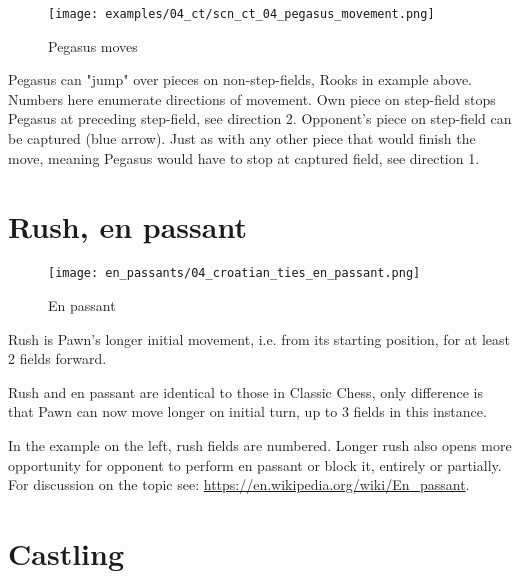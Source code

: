 \noindent
\begin{figure}[!h]
\vspace{-1.2\baselineskip}
\texttt{[image: examples/04\_ct/scn\_ct\_04\_pegasus\_movement.png]}
\caption{Pegasus moves}
\label{fig:scn_ct_04_pegasus_movement}
\end{figure}

Pegasus can "jump" over pieces on non-step-fields, Rooks in example above. Numbers
here enumerate directions of movement. Own piece on step-field stops Pegasus at
preceding step-field, see direction 2. Opponent's piece on step-field can be captured
(blue arrow). Just as with any other piece that would finish the move, meaning Pegasus
would have to stop at captured field, see direction 1.

\clearpage %

\section*{Rush, en passant}
\label{sec:Croatian Ties/Rush, en passant}

\noindent
\begin{wrapfigure}{l}{0.4\textwidth}
\centering
\texttt{[image: en\_passants/04\_croatian\_ties\_en\_passant.png]}
\caption{En passant}
\label{fig:04_croatian_ties_en_passant}
\end{wrapfigure}
Rush is Pawn's longer initial movement, i.e. from its starting position, for at least
2 fields forward.

Rush and en passant are identical to those in Classic Chess, only difference is that Pawn
can now move longer on initial turn, up to 3 fields in this instance.

In the example on the left, rush fields are numbered. Longer rush also opens more opportunity
for opponent to perform en passant or block it, entirely or partially. For discussion on the
topic see:
\href{https://en.wikipedia.org/wiki/En\_passant}{https://en.wikipedia.org/wiki/En\_passant}.

\clearpage %

\section*{Castling}
\label{sec:Croatian Ties/Castling}

